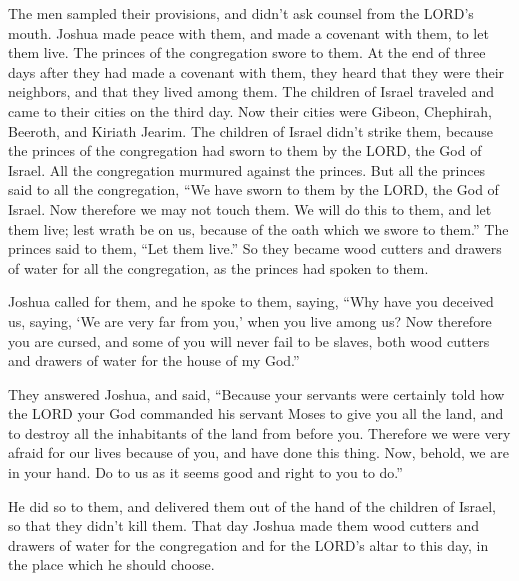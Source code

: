 \myverse{}The men sampled their provisions, and didn’t ask counsel from
the LORD’s mouth.
\myverse{}Joshua made peace with them, and made a covenant with them, to let them live.
The princes of the congregation swore to them.
\myverse{}At the end of three days after they had made a covenant with them, they heard
that they were their neighbors, and that they lived among them.
\myverse{}The children of Israel traveled and came to their cities on the third day.
Now their cities were Gibeon, Chephirah, Beeroth, and Kiriath Jearim.
\myverse{}The children of Israel didn’t strike them, because the princes of the congregation
had sworn to them by the LORD, the God of Israel. All the congregation murmured against the princes.
\myverse{}But all the princes said to all the congregation, “We have sworn to them by
the LORD, the God of Israel. Now therefore we may not touch them.
\myverse{}We will do this to them, and let them live; lest wrath be on us, because of
the oath which we swore to them.”
\myverse{}The princes said to them, “Let them live.” So they became wood cutters and
drawers of water for all the congregation, as the princes had spoken to them.

\myverse{}Joshua called for them, and he spoke to them, saying, “Why have
you deceived us, saying, ‘We are very far from you,’ when you live among us?
\myverse{}Now therefore you are cursed, and some of you will never fail to be slaves,
both wood cutters and drawers of water for the house of my God.”

\myverse{}They answered Joshua, and said, “Because your servants were certainly
told how the LORD your God commanded his servant Moses to give you all the land, and to destroy all the
inhabitants of the land from before you. Therefore we were very afraid for our lives because of you, and
have done this thing.
\myverse{}Now, behold, we are in your hand. Do to us as it seems good and right to you
to do.”

\myverse{}He did so to them, and delivered them out of the hand of the
children of Israel, so that they didn’t kill them.
\myverse{}That day Joshua made them wood cutters and drawers of water for the congregation
and for the LORD’s altar to this day, in the place which he should choose.


